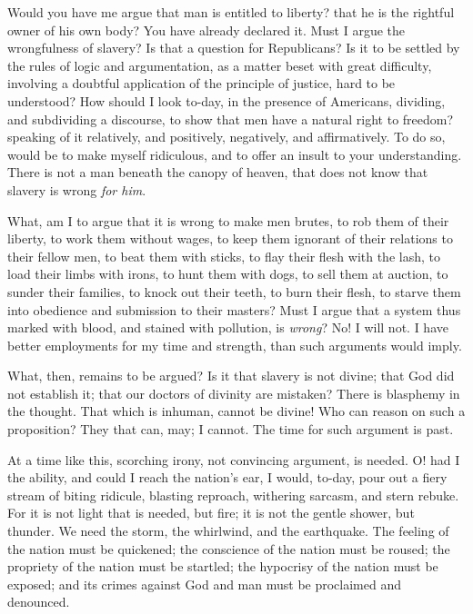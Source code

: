 Would you have me argue that man is entitled to liberty? that he is the rightful owner of his own body? You have already declared it. Must I argue the wrongfulness of slavery? Is that a question for Republicans? Is it to be settled by the rules of logic and argumentation, as a matter beset with great difficulty, involving a doubtful application of the principle of justice, hard to be understood? How should I look to-day, in the presence of Americans, dividing, and subdividing a discourse, to show that men have a natural right to freedom? speaking of it relatively, and positively, negatively, and affirmatively. To do so, would be to make myself ridiculous, and to offer an insult to your understanding. There is not a man beneath the canopy of heaven, that does not know that slavery is wrong \textit{for him}.\par

What, am I to argue that it is wrong to make men brutes, to rob them of their liberty, to work them without wages, to keep them ignorant of their relations to their fellow men, to beat them with sticks, to flay their flesh with the lash, to load their limbs with irons, to hunt them with dogs, to sell them at auction, to sunder their families, to knock out their teeth, to burn their flesh, to starve them into obedience and submission to their masters? Must I argue that a system thus marked with blood, and stained with pollution, is \textit{wrong}? No! I will not. I have better employments for my time and strength, than such arguments would imply.\par

What, then, remains to be argued? Is it that slavery is not divine; that God did not establish it; that our doctors of divinity are mistaken? There is blasphemy in the thought. That which is inhuman, cannot be divine! Who can reason on such a proposition? They that can, may; I cannot. The time for such argument is past.\par

At a time like this, scorching irony, not convincing argument, is needed. O! had I the ability, and could I reach the nation’s ear, I would, to-day, pour out a fiery stream of biting ridicule, blasting reproach, withering sarcasm, and stern rebuke. For it is not light that is needed, but fire; it is not the gentle shower, but thunder. We need the storm, the whirlwind, and the earthquake. The feeling of the nation must be quickened; the conscience of the nation must be roused; the propriety of the nation must be startled; the hypocrisy of the nation must be exposed; and its crimes against God and man must be proclaimed and denounced.\par


